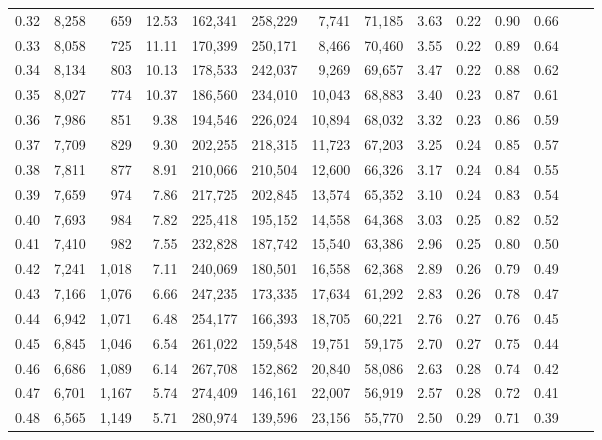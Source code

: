 \begin{tabular}{rrrrrrrrrrrrrr}
0.32 &  8,258 &    659 &   12.53 &  162,341 &  258,229 &   7,741 &  71,185 &  3.63 &  0.22 &  0.90 &      0.66 \\
0.33 &  8,058 &    725 &   11.11 &  170,399 &  250,171 &   8,466 &  70,460 &  3.55 &  0.22 &  0.89 &      0.64 \\
0.34 &  8,134 &    803 &   10.13 &  178,533 &  242,037 &   9,269 &  69,657 &  3.47 &  0.22 &  0.88 &      0.62 \\
0.35 &  8,027 &    774 &   10.37 &  186,560 &  234,010 &  10,043 &  68,883 &  3.40 &  0.23 &  0.87 &      0.61 \\
0.36 &  7,986 &    851 &    9.38 &  194,546 &  226,024 &  10,894 &  68,032 &  3.32 &  0.23 &  0.86 &      0.59 \\
0.37 &  7,709 &    829 &    9.30 &  202,255 &  218,315 &  11,723 &  67,203 &  3.25 &  0.24 &  0.85 &      0.57 \\
0.38 &  7,811 &    877 &    8.91 &  210,066 &  210,504 &  12,600 &  66,326 &  3.17 &  0.24 &  0.84 &      0.55 \\
0.39 &  7,659 &    974 &    7.86 &  217,725 &  202,845 &  13,574 &  65,352 &  3.10 &  0.24 &  0.83 &      0.54 \\
0.40 &  7,693 &    984 &    7.82 &  225,418 &  195,152 &  14,558 &  64,368 &  3.03 &  0.25 &  0.82 &      0.52 \\
0.41 &  7,410 &    982 &    7.55 &  232,828 &  187,742 &  15,540 &  63,386 &  2.96 &  0.25 &  0.80 &      0.50 \\
0.42 &  7,241 &  1,018 &    7.11 &  240,069 &  180,501 &  16,558 &  62,368 &  2.89 &  0.26 &  0.79 &      0.49 \\
0.43 &  7,166 &  1,076 &    6.66 &  247,235 &  173,335 &  17,634 &  61,292 &  2.83 &  0.26 &  0.78 &      0.47 \\
0.44 &  6,942 &  1,071 &    6.48 &  254,177 &  166,393 &  18,705 &  60,221 &  2.76 &  0.27 &  0.76 &      0.45 \\
0.45 &  6,845 &  1,046 &    6.54 &  261,022 &  159,548 &  19,751 &  59,175 &  2.70 &  0.27 &  0.75 &      0.44 \\
0.46 &  6,686 &  1,089 &    6.14 &  267,708 &  152,862 &  20,840 &  58,086 &  2.63 &  0.28 &  0.74 &      0.42 \\
0.47 &  6,701 &  1,167 &    5.74 &  274,409 &  146,161 &  22,007 &  56,919 &  2.57 &  0.28 &  0.72 &      0.41 \\
0.48 &  6,565 &  1,149 &    5.71 &  280,974 &  139,596 &  23,156 &  55,770 &  2.50 &  0.29 &  0.71 &      0.39 \\

\end{tabular}
